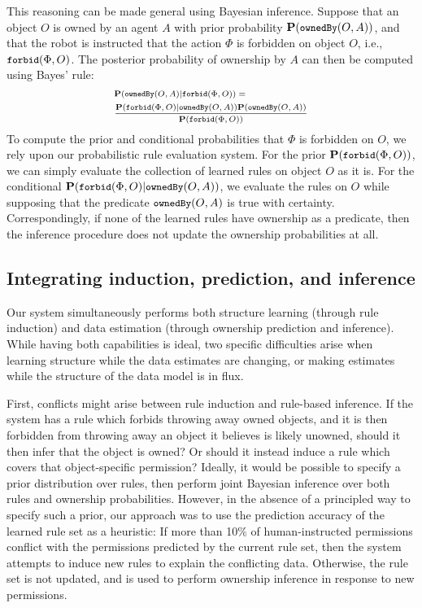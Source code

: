 \documentclass[letterpaper]{article} %
\begin{document}
This reasoning can be made general using Bayesian inference. Suppose that an object $O$ is owned by an agent $A$ with prior probability $\small{\mathbf{P}(\texttt{ownedBy}(O,A))}$, and that the robot is instructed that the action $\Phi$ is forbidden on object $O$, i.e., $\small{\texttt{forbid}(\Phi,O)}$. The posterior probability of ownership by $A$ can then be computed using Bayes' rule:
\begin{equation}
\begin{scriptsize}
\begin{aligned}
    &\mathbf{P}(\texttt{ownedBy}(O,A)|\texttt{forbid}(\Phi,O)) = \\
    &\frac{\mathbf{P}(\texttt{forbid}(\Phi,O)|\texttt{ownedBy}(O,A))\mathbf{P}(\texttt{ownedBy}(O,A))}{\mathbf{P}(\texttt{forbid}(\Phi,O))}
    \label{eq:RuleBasedInference}
\end{aligned}
\end{scriptsize}
\end{equation}
To compute the prior and conditional probabilities that $\Phi$ is forbidden on $O$, we rely upon our probabilistic rule evaluation system. For the prior $\small\mathbf{P}(\texttt{forbid}(\Phi,O))$, we can simply evaluate the collection of learned rules on object $O$ as it is. For the conditional $\small\mathbf{P}(\texttt{forbid}(\Phi,O)|\texttt{ownedBy}(O,A))$, we evaluate the rules on $O$ while supposing that the predicate $\small\texttt{ownedBy}(O,A)$ is true with certainty. Correspondingly, if none of the learned rules have ownership as a predicate, then the inference procedure does not update the ownership probabilities at all.

\subsection{Integrating induction, prediction, and inference}

Our system simultaneously performs both structure learning (through rule induction) and data estimation (through ownership prediction and inference). While having both capabilities is ideal, two specific difficulties arise when learning structure while the data estimates are changing, or making estimates while the structure of the data model is in flux.

First, conflicts might arise between rule induction and rule-based inference. If the system has a rule which forbids throwing away owned objects, and it is then forbidden from throwing away an object it believes is likely unowned, should it then infer that the object is owned? Or should it instead induce a rule which covers that object-specific permission? Ideally, it would be possible to specify a prior distribution over rules, then perform joint Bayesian inference over both rules and ownership probabilities. However, in the absence of a principled way to specify such a prior, our approach was to use the prediction accuracy of the learned rule set as a heuristic: If more than 10\% of human-instructed permissions conflict with the permissions predicted by the current rule set, then the system attempts to induce new rules to explain the conflicting data. Otherwise, the rule set is not updated, and is used to perform ownership inference in response to new permissions.
\end{document}
